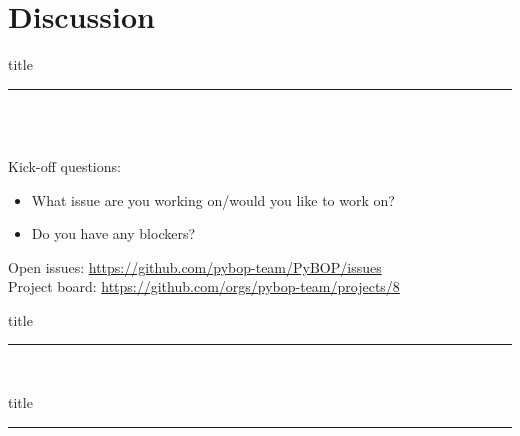 \documentclass[aspectratio=169]{beamer}
\begin{document}
\section{Discussion}

\begin{frame}[plain]
    \centering
    \begin{beamercolorbox}[sep=8pt,center,shadow=true,rounded=true]{title}
    \par%
    \color{oxfordblue}\noindent\rule{10cm}{1pt} \\
    \LARGE{\faUserPlus} \LARGE{\faBug} \\
    \normalsize
    \begin{flushleft}
        Kick-off questions:
    \end{flushleft}
    \begin{itemize}
        \item What issue are you working on/would you like to work on?
        \item Do you have any blockers?
    \end{itemize}
    \vspace{6mm} \normalsize
    Open issues: \href{https://github.com/pybop-team/PyBOP/issues}{https://github.com/pybop-team/PyBOP/issues} \\
    Project board: \href{https://github.com/orgs/pybop-team/projects/9}{https://github.com/orgs/pybop-team/projects/8}
    \end{beamercolorbox}
\end{frame}

\begin{frame}[plain]
    \centering
    \begin{beamercolorbox}[sep=8pt,center,shadow=true,rounded=true]{title}
    \par%
    \color{oxfordblue}\noindent\rule{10cm}{1pt} \\
    \end{beamercolorbox}
\end{frame}

\begin{frame}[plain]
    \centering
    \begin{beamercolorbox}[sep=8pt,center,shadow=true,rounded=true]{title}
    \par%
    \color{oxfordblue}\noindent\rule{10cm}{1pt} \\
    \end{beamercolorbox}
\end{frame}
\end{document}
